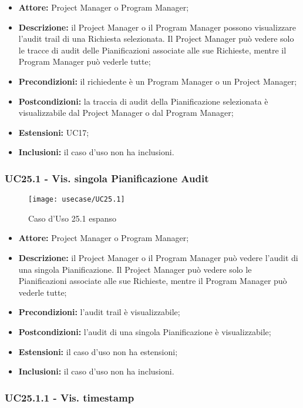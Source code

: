 \begin{itemize}[label=$\circ$]
\item \textbf{Attore:} Project Manager o Program Manager;
\item \textbf{Descrizione:} il Project Manager o il Program Manager possono visualizzare
l’audit trail di una Richiesta selezionata. Il Project Manager può vedere solo le tracce di audit delle Pianificazioni associate alle sue Richieste, mentre il Program Manager può vederle tutte;
\item \textbf{Precondizioni:} il richiedente è un Program Manager o un Project Manager;
\item \textbf{Postcondizioni:} la traccia di audit della Pianificazione selezionata è visualizzabile dal Project Manager o dal Program Manager;
\item \textbf{Estensioni:} UC17;
\item \textbf{Inclusioni:} il caso d'uso non ha inclusioni.
\end{itemize}


\subsubsection*{UC25.1 - Vis. singola Pianificazione Audit}
\begin{figure}[H] 
    \texttt{[image: usecase/UC25.1]} 
    \caption{Caso d'Uso 25.1 espanso}
\end{figure}

\begin{itemize}[label=$\circ$]
\item \textbf{Attore:} Project Manager o Program Manager;
\item \textbf{Descrizione:} il Project Manager o il Program Manager può vedere l'audit di una singola Pianificazione. Il Project Manager può vedere solo le Pianificazioni associate alle sue Richieste, mentre il Program Manager può vederle tutte;
\item \textbf{Precondizioni:} l'audit trail è visualizzabile;
\item \textbf{Postcondizioni:} l'audit di una singola Pianificazione è visualizzabile;
\item \textbf{Estensioni:} il caso d'uso non ha estensioni;
\item \textbf{Inclusioni:} il caso d'uso non ha inclusioni.
\end{itemize}

\subsubsection*{UC25.1.1 - Vis. timestamp}

